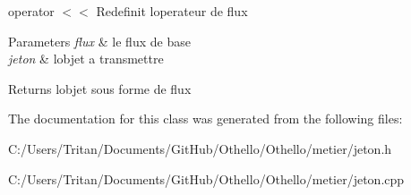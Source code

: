 operator $<$$<$ Redefinit l\textquotesingle{}operateur de flux 


\begin{DoxyParams}{Parameters}
{\em flux} & le flux de base \\
\hline
{\em jeton} & l\textquotesingle{}objet a transmettre \\
\hline
\end{DoxyParams}
\begin{DoxyReturn}{Returns}
l\textquotesingle{}objet sous forme de flux 
\end{DoxyReturn}


The documentation for this class was generated from the following files\+:\begin{DoxyCompactItemize}
\item 
C\+:/\+Users/\+Tritan/\+Documents/\+Git\+Hub/\+Othello/\+Othello/metier/jeton.\+h\item 
C\+:/\+Users/\+Tritan/\+Documents/\+Git\+Hub/\+Othello/\+Othello/metier/jeton.\+cpp\end{DoxyCompactItemize}
